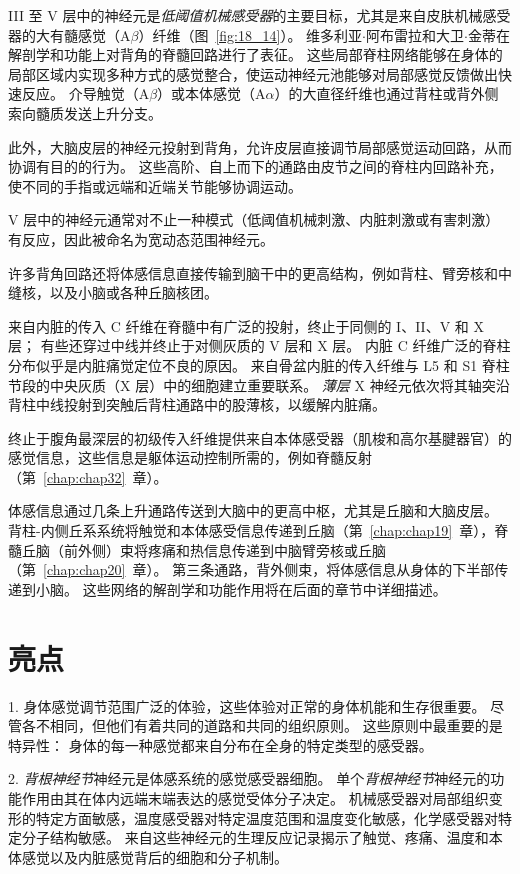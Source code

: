 III 至 V 层中的神经元是\textit{低阈值机械感受器}的主要目标，尤其是来自皮肤机械感受器的大有髓感觉（A$\beta$）纤维（图~\ref{fig:18_14}）。
维多利亚$\cdot$阿布雷拉和大卫$\cdot$金蒂在解剖学和功能上对背角的脊髓回路进行了表征。
这些局部脊柱网络能够在身体的局部区域内实现多种方式的感觉整合，使运动神经元池能够对局部感觉反馈做出快速反应。
介导触觉（A$\beta$）或本体感觉（A$\alpha$）的大直径纤维也通过背柱或背外侧索向髓质发送上升分支。


此外，大脑皮层的神经元投射到背角，允许皮层直接调节局部感觉运动回路，从而协调有目的的行为。
这些高阶、自上而下的通路由皮节之间的脊柱内回路补充，使不同的手指或远端和近端关节能够协调运动。


V 层中的神经元通常对不止一种模式（低阈值机械刺激、内脏刺激或有害刺激）有反应，因此被命名为宽动态范围神经元。


许多背角回路还将体感信息直接传输到脑干中的更高结构，例如背柱、臂旁核和中缝核，以及小脑或各种丘脑核团。


来自内脏的传入 C 纤维在脊髓中有广泛的投射，终止于同侧的 I、II、V 和 X 层；
有些还穿过中线并终止于对侧灰质的 V 层和 X 层。
内脏 C 纤维广泛的脊柱分布似乎是内脏痛觉定位不良的原因。 
来自骨盆内脏的传入纤维与 L5 和 S1 脊柱节段的中央灰质（X 层）中的细胞建立重要联系。 
\textit{薄层} X 神经元依次将其轴突沿背柱中线投射到突触后背柱通路中的股薄核，以缓解内脏痛。


终止于腹角最深层的初级传入纤维提供来自本体感受器（肌梭和高尔基腱器官）的感觉信息，这些信息是躯体运动控制所需的，例如脊髓反射（第~\ref{chap:chap32}~章）。


体感信息通过几条上升通路传送到大脑中的更高中枢，尤其是丘脑和大脑皮层。
背柱-内侧丘系系统将触觉和本体感受信息传递到丘脑（第~\ref{chap:chap19}~章），脊髓丘脑（前外侧）束将疼痛和热信息传递到中脑臂旁核或丘脑（第~\ref{chap:chap20}~章）。
第三条通路，背外侧束，将体感信息从身体的下半部传递到小脑。
这些网络的解剖学和功能作用将在后面的章节中详细描述。




\section{亮点}


1. 身体感觉调节范围广泛的体验，这些体验对正常的身体机能和生存很重要。
尽管各不相同，但他们有着共同的道路和共同的组织原则。
这些原则中最重要的是特异性：
身体的每一种感觉都来自分布在全身的特定类型的感受器。 


2. \textit{背根神经节}神经元是体感系统的感觉感受器细胞。
单个\textit{背根神经节}神经元的功能作用由其在体内远端末端表达的感觉受体分子决定。
机械感受器对局部组织变形的特定方面敏感，温度感受器对特定温度范围和温度变化敏感，化学感受器对特定分子结构敏感。
来自这些神经元的生理反应记录揭示了触觉、疼痛、温度和本体感觉以及内脏感觉背后的细胞和分子机制。 


